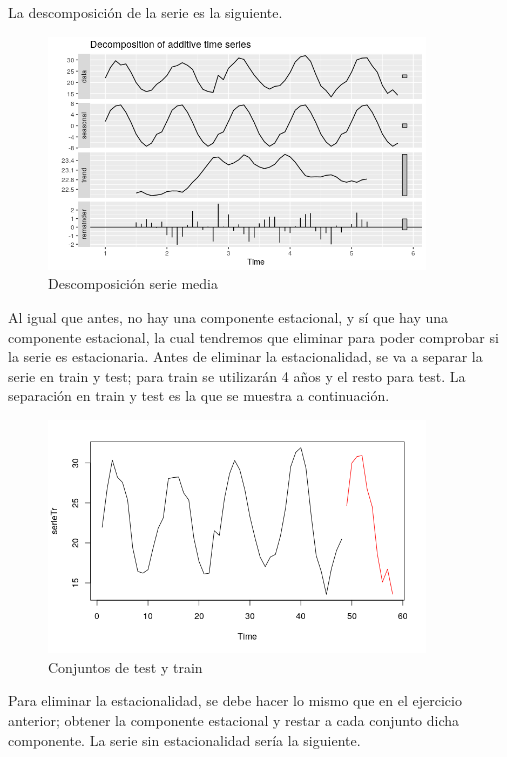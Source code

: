 La descomposición de la serie es la siguiente.

\begin{figure}[H]
	\centering
	\includegraphics[width=100mm]{imagenes/decompose_mean.png}
	\caption{Descomposición serie media}
	\label{fig:17}
\end{figure}

Al igual que antes, no hay una componente estacional, y sí que hay una componente estacional, la cual tendremos que eliminar para poder comprobar si la serie es estacionaria. Antes de eliminar la estacionalidad, se va a separar la serie en train y test; para train se utilizarán 4 años y el resto para test. La separación en train y test es la que se muestra a continuación.

\begin{figure}[H]
	\centering
	\includegraphics[width=100mm]{imagenes/train_test_mean.png}
	\caption{Conjuntos de test y train}
	\label{fig:18}
\end{figure}

Para eliminar la estacionalidad, se debe hacer lo mismo que en el ejercicio anterior; obtener la componente estacional y restar a cada conjunto dicha componente. La serie sin estacionalidad sería la siguiente.

